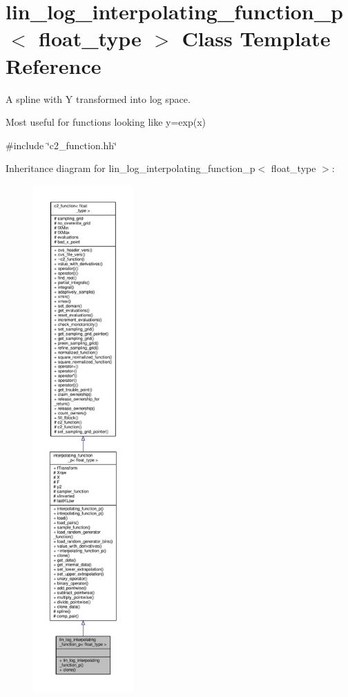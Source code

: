 \hypertarget{classlin__log__interpolating__function__p}{}\section{lin\+\_\+log\+\_\+interpolating\+\_\+function\+\_\+p$<$ float\+\_\+type $>$ Class Template Reference}
\label{classlin__log__interpolating__function__p}


A spline with Y transformed into log space.

Most useful for functions looking like y=exp(x)  




{\ttfamily \#include \char`\"{}c2\+\_\+function.\+hh\char`\"{}}



Inheritance diagram for lin\+\_\+log\+\_\+interpolating\+\_\+function\+\_\+p$<$ float\+\_\+type $>$\+:
\nopagebreak
\begin{figure}[H]
\begin{center}
\leavevmode
\includegraphics[height=550pt]{classlin__log__interpolating__function__p__inherit__graph}
\end{center}
\end{figure}


